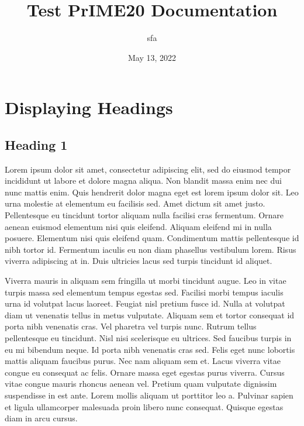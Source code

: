 \documentclass[letterpaper,10pt,english]{sphinxmanual}
\title{Test PrIME20 Documentation}
\date{May 13, 2022}
\author{sfa}
\begin{document}
\pagestyle{empty}
\sphinxmaketitle
\pagestyle{plain}
\sphinxtableofcontents
\pagestyle{normal}
\label{\detokenize{index::doc}}


\sphinxstepscope


\chapter{Displaying Headings}
\label{\detokenize{topic1:displaying-headings}}\label{\detokenize{topic1::doc}}

\section{Heading 1}
\label{\detokenize{topic1:heading-1}}
\sphinxAtStartPar
Lorem ipsum dolor sit amet, consectetur adipiscing elit, sed do eiusmod tempor incididunt ut labore et dolore magna aliqua. Non blandit massa enim nec dui nunc mattis enim. Quis hendrerit dolor magna eget est lorem ipsum dolor sit. Leo urna molestie at elementum eu facilisis sed. Amet dictum sit amet justo. Pellentesque eu tincidunt tortor aliquam nulla facilisi cras fermentum. Ornare aenean euismod elementum nisi quis eleifend. Aliquam eleifend mi in nulla posuere. Elementum nisi quis eleifend quam. Condimentum mattis pellentesque id nibh tortor id. Fermentum iaculis eu non diam phasellus vestibulum lorem. Risus viverra adipiscing at in. Duis ultricies lacus sed turpis tincidunt id aliquet.

\sphinxAtStartPar
Viverra mauris in aliquam sem fringilla ut morbi tincidunt augue. Leo in vitae turpis massa sed elementum tempus egestas sed. Facilisi morbi tempus iaculis urna id volutpat lacus laoreet. Feugiat nisl pretium fusce id. Nulla at volutpat diam ut venenatis tellus in metus vulputate. Aliquam sem et tortor consequat id porta nibh venenatis cras. Vel pharetra vel turpis nunc. Rutrum tellus pellentesque eu tincidunt. Nisl nisi scelerisque eu ultrices. Sed faucibus turpis in eu mi bibendum neque. Id porta nibh venenatis cras sed. Felis eget nunc lobortis mattis aliquam faucibus purus. Nec nam aliquam sem et. Lacus viverra vitae congue eu consequat ac felis. Ornare massa eget egestas purus viverra. Cursus vitae congue mauris rhoncus aenean vel. Pretium quam vulputate dignissim suspendisse in est ante. Lorem mollis aliquam ut porttitor leo a. Pulvinar sapien et ligula ullamcorper malesuada proin libero nunc consequat. Quisque egestas diam in arcu cursus.
\end{document}
